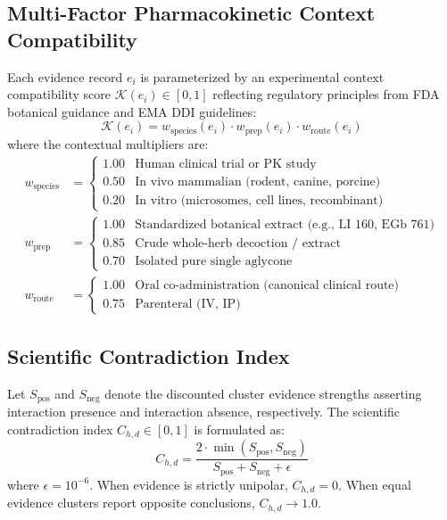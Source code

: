 \documentclass[10pt,journal,compsoc]{IEEEtran}
\begin{document}
\subsection{Multi-Factor Pharmacokinetic Context Compatibility}
Each evidence record $e_i$ is parameterized by an experimental context compatibility score $\mathcal{K}(e_i) \in [0, 1]$ reflecting regulatory principles from FDA botanical guidance and EMA DDI guidelines:
\begin{equation}
\mathcal{K}(e_i) = w_{\text{species}}(e_i) \cdot w_{\text{prep}}(e_i) \cdot w_{\text{route}}(e_i)
\end{equation}
where the contextual multipliers are:
\begin{align}
w_{\text{species}} &= \begin{cases} 1.00 & \text{Human clinical trial or PK study} \\ 0.50 & \text{In vivo mammalian (rodent, canine, porcine)} \\ 0.20 & \text{In vitro (microsomes, cell lines, recombinant)} \end{cases} \\
w_{\text{prep}} &= \begin{cases} 1.00 & \text{Standardized botanical extract (e.g., LI 160, EGb 761)} \\ 0.85 & \text{Crude whole-herb decoction / extract} \\ 0.70 & \text{Isolated pure single aglycone} \end{cases} \\
w_{\text{route}} &= \begin{cases} 1.00 & \text{Oral co-administration (canonical clinical route)} \\ 0.75 & \text{Parenteral (IV, IP)} \end{cases}
\end{align}

\subsection{Scientific Contradiction Index}
Let $S_{\text{pos}}$ and $S_{\text{neg}}$ denote the discounted cluster evidence strengths asserting interaction presence and interaction absence, respectively. The scientific contradiction index $C_{h,d} \in [0, 1]$ is formulated as:
\begin{equation}
C_{h,d} = \frac{2 \cdot \min(S_{\text{pos}}, S_{\text{neg}})}{S_{\text{pos}} + S_{\text{neg}} + \epsilon}
\end{equation}
where $\epsilon = 10^{-6}$. When evidence is strictly unipolar, $C_{h,d} = 0$. When equal evidence clusters report opposite conclusions, $C_{h,d} \to 1.0$.
\end{document}
